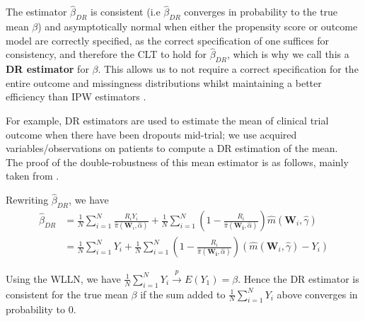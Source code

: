 \documentclass[12pt,twoside]{article}
\begin{document}
The estimator $\hat\beta_{DR}$ is consistent (i.e $\hat\beta_{DR}$ converges in probability to the true mean $\beta$) and asymptotically normal when either the propensity score or outcome model are correctly specified, as the correct specification of one suffices for consistency, and therefore the CLT to hold for $\hat\beta_{DR}$, which is why we call this a \textbf{DR estimator} for $\beta$. This allows us to not require a correct specification for the entire outcome and missingness distributions whilst maintaining a better efficiency than IPW estimators \citep{bangrobins,vansteelandt}.

For example, DR estimators are used to estimate the mean of clinical trial outcome when there have been dropouts mid-trial; we use acquired variables/observations on patients to compute a DR estimation of the mean. \\

The proof of the double-robustness of this mean estimator is as follows, mainly taken from \citet{vansteelandt}.

Rewriting $\hat{\beta}_{DR}$, we have
\begin{align*}
    \hat{\beta}_{DR} & = \frac{1}{N}\sum_{i=1}^{N}\frac{R_iY_i}{\hat\pi(\mathbf{W}_i, \hat{\alpha})} + \frac{1}{N}\sum_{i=1}^{N} \left(1 - \frac{R_i}{\hat\pi(\mathbf{W_i},\hat{\alpha})} \right) \hat m(\mathbf{W}_i, \hat\gamma) \\
    & = \frac{1}{N}\sum_{i=1}^{N} Y_i + \frac{1}{N}\sum_{i=1}^{N}\left(1 - \frac{R_i}{\hat\pi(\mathbf{W_i},\hat{\alpha})} \right) (\hat m(\mathbf{W}_i, \hat\gamma)-Y_i)
\end{align*}

Using the WLLN, we have $\frac{1}{N}\sum_{i=1}^{N} Y_i\xrightarrow{p} E(Y_1) = \beta$. Hence the DR estimator is consistent for the true mean $\beta$ if the sum added to $\frac{1}{N}\sum_{i=1}^{N} Y_i$ above converges in probability to 0. \\
\end{document}

